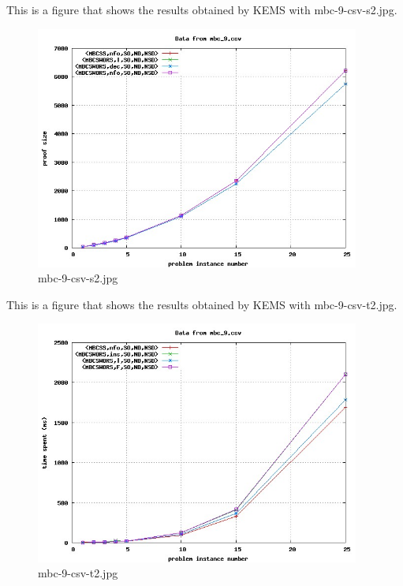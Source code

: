 This is a figure that shows the results obtained by KEMS with mbc-9-csv-s2.jpg.
\begin{figure}[htbp]
\begin{center}
\includegraphics[width=0.95\textwidth]{figuras/mbc-9-csv-s2.jpg}
\end{center}
\caption{mbc-9-csv-s2.jpg}
\end{figure}

This is a figure that shows the results obtained by KEMS with mbc-9-csv-t2.jpg.
\begin{figure}[htbp]
\begin{center}
\includegraphics[width=0.95\textwidth]{figuras/mbc-9-csv-t2.jpg}
\end{center}
\caption{mbc-9-csv-t2.jpg}
\end{figure}

